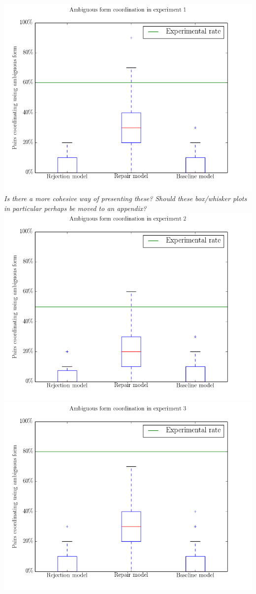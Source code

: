 \documentclass[12pt,a4paper]{article}
\begin{document}
\begin{center}
\includegraphics[width=\textwidth]{ambi_coord_exp1.png}
\textit{Is there a more cohesive way of presenting these? Should these box/whisker plots in particular perhaps be moved to an appendix?}
\includegraphics[width=\textwidth]{ambi_coord_exp2.png}
\includegraphics[width=\textwidth]{ambi_coord_exp3.png}

\end{center}
\end{document}
